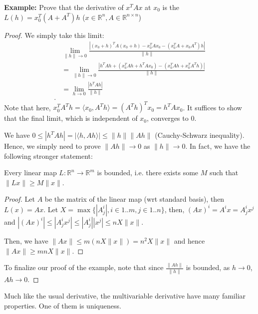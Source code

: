 \textbf{Example:} Prove that the derivative of \( x^{T}Ax \) at \( x_{0} \) is
the \( L(h) = x_{0}^{T}(A+ A^{T})h \) (\( x \in \mathbb{R}^{n}, A \in
\mathbb{R}^{n\times n} \))
\begin{proof} 
  We simply take this limit:
  \begin{align*}
    &\lim_{\|h\| \to 0} \frac{|(x_{0}+h)^{T}A(x_{0}+h) - x_{0}^{T}Ax_{0} -
    (x_{0}^{T}A + x_{0}A^{T})h|}{\|h\|}\\
    &= \lim_{\|h\| \to 0} \frac{|h^{T}Ah + (x_{0}^{T}Ah + h^{T}Ax_{0}) -
    (x_{0}^{T}Ah + x_{0}^{T}A^{T}h)|}{\|h\|}   \\
    &= \lim_{h \to  0} \frac{|h^{T}Ah|}{\|h\|} \\
  .\end{align*}
Note that here, \( x_{0}^{T}A^{T}h = \langle x_{0}, A^{T}h \rangle = (A^{T}h)^{T}x_{0} =
h^{T}Ax_{0} \). It suffices to show that the final limit, which is independent
of \( x_{0} \), converges to \( 0 \).

We have \( 0 \le  |h^{T}Ah| = |\langle h, Ah \rangle| \le \|h\| \|Ah\| \)
(Cauchy-Schwarz inequality). Hence, we simply need to prove \( \|Ah\| \to 0 \)
as \( \|h\| \to 0 \). In fact, we have the following stronger statement:

\begin{lemma}
\label{lem:Every linear map between Euclidean spaces are bounded}
  Every linear map \( L: \mathbb{R}^{n} \to  \mathbb{R}^{m} \) is bounded, i.e.
  there exists some \( M \) such that \( \|Lx\| \ge M\|x\| \).
\end{lemma}

\begin{proof}
  Let \( A \) be the matrix of the linear map (wrt standard basis), then \( L(x)
  = Ax\). Let \( X = \max \{|A^{i}_{j}|, i \in 1..m, j \in 1..n\}   \), then, \( (Ax)^{i}
  = A^{i}x = A^{i}_{j}x^{j} \) and \( |(Ax)^{i}| \le |A^{i}_{j}x^{j}| \le
  |A^{i}_{j}| |x^{j}| \le nX\|x\| \).

  Then, we have \( \|Ax\| \le m(nX\|x\|) = n^2X \|x\| \) and hence \( \|Ax\| \ge
  mnX \|x\|\).
\end{proof}

To finalize our proof of the example, note that since \( \frac{\|Ah\|}{\|h\|} \)
is bounded, as \( h \to 0 \), \( Ah \to 0 \).
\end{proof}

Much like the usual derivative, the multivariable derivative have many familiar
properties. One of them is uniqueness.

